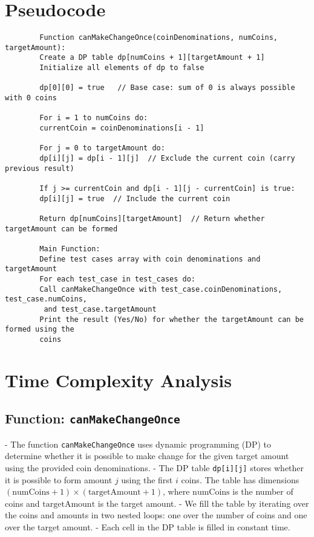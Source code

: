 \documentclass[a4paper,12pt]{report}
\begin{document}
\section*{Pseudocode}

\begin{tcolorbox}[colback=white, colframe=black, boxrule=0.5pt]
	\ttfamily\small
	\begin{verbatim}
		Function canMakeChangeOnce(coinDenominations, numCoins, targetAmount):
		Create a DP table dp[numCoins + 1][targetAmount + 1]
		Initialize all elements of dp to false
		
		dp[0][0] = true   // Base case: sum of 0 is always possible with 0 coins
		
		For i = 1 to numCoins do:
		currentCoin = coinDenominations[i - 1]
		
		For j = 0 to targetAmount do:
		dp[i][j] = dp[i - 1][j]  // Exclude the current coin (carry previous result)
		
		If j >= currentCoin and dp[i - 1][j - currentCoin] is true:
		dp[i][j] = true  // Include the current coin
		
		Return dp[numCoins][targetAmount]  // Return whether targetAmount can be formed
		
		Main Function:
		Define test cases array with coin denominations and targetAmount
		For each test_case in test_cases do:
		Call canMakeChangeOnce with test_case.coinDenominations, test_case.numCoins,
		 and test_case.targetAmount
		Print the result (Yes/No) for whether the targetAmount can be formed using the 
		coins
	\end{verbatim}
\end{tcolorbox}

\section*{Time Complexity Analysis}

\subsection*{Function: \texttt{canMakeChangeOnce}}

- The function \texttt{canMakeChangeOnce} uses dynamic programming (DP) to determine whether it is possible to make change for the given target amount using the provided coin denominations.
- The DP table \texttt{dp[i][j]} stores whether it is possible to form amount \(j\) using the first \(i\) coins. The table has dimensions \((\text{numCoins} + 1) \times (\text{targetAmount} + 1)\), where \(\text{numCoins}\) is the number of coins and \(\text{targetAmount}\) is the target amount.
- We fill the table by iterating over the coins and amounts in two nested loops: one over the number of coins and one over the target amount.
- Each cell in the DP table is filled in constant time.
\end{document}
